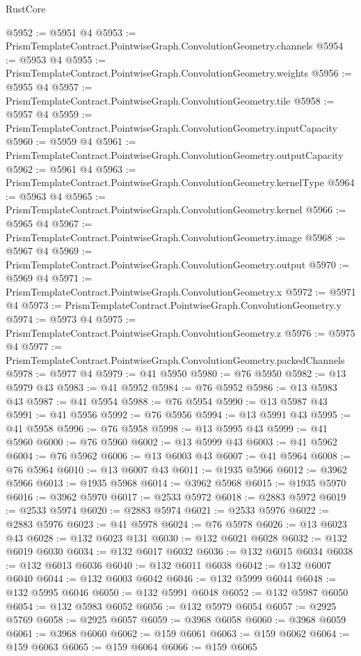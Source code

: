 \begin{lexlean}{RustCore}
\begin{coremodule}
@5952 := @5951 @4
@5953 := PrismTemplateContract.PointwiseGraph.ConvolutionGeometry.channels
@5954 := @5953 @4
@5955 := PrismTemplateContract.PointwiseGraph.ConvolutionGeometry.weights
@5956 := @5955 @4
@5957 := PrismTemplateContract.PointwiseGraph.ConvolutionGeometry.tile
@5958 := @5957 @4
@5959 := PrismTemplateContract.PointwiseGraph.ConvolutionGeometry.inputCapacity
@5960 := @5959 @4
@5961 := PrismTemplateContract.PointwiseGraph.ConvolutionGeometry.outputCapacity
@5962 := @5961 @4
@5963 := PrismTemplateContract.PointwiseGraph.ConvolutionGeometry.kernelType
@5964 := @5963 @4
@5965 := PrismTemplateContract.PointwiseGraph.ConvolutionGeometry.kernel
@5966 := @5965 @4
@5967 := PrismTemplateContract.PointwiseGraph.ConvolutionGeometry.image
@5968 := @5967 @4
@5969 := PrismTemplateContract.PointwiseGraph.ConvolutionGeometry.output
@5970 := @5969 @4
@5971 := PrismTemplateContract.PointwiseGraph.ConvolutionGeometry.x
@5972 := @5971 @4
@5973 := PrismTemplateContract.PointwiseGraph.ConvolutionGeometry.y
@5974 := @5973 @4
@5975 := PrismTemplateContract.PointwiseGraph.ConvolutionGeometry.z
@5976 := @5975 @4
@5977 := PrismTemplateContract.PointwiseGraph.ConvolutionGeometry.packedChannels
@5978 := @5977 @4
@5979 := @41 @5950
@5980 := @76 @5950
@5982 := @13 @5979 @43
@5983 := @41 @5952
@5984 := @76 @5952
@5986 := @13 @5983 @43
@5987 := @41 @5954
@5988 := @76 @5954
@5990 := @13 @5987 @43
@5991 := @41 @5956
@5992 := @76 @5956
@5994 := @13 @5991 @43
@5995 := @41 @5958
@5996 := @76 @5958
@5998 := @13 @5995 @43
@5999 := @41 @5960
@6000 := @76 @5960
@6002 := @13 @5999 @43
@6003 := @41 @5962
@6004 := @76 @5962
@6006 := @13 @6003 @43
@6007 := @41 @5964
@6008 := @76 @5964
@6010 := @13 @6007 @43
@6011 := @1935 @5966
@6012 := @3962 @5966
@6013 := @1935 @5968
@6014 := @3962 @5968
@6015 := @1935 @5970
@6016 := @3962 @5970
@6017 := @2533 @5972
@6018 := @2883 @5972
@6019 := @2533 @5974
@6020 := @2883 @5974
@6021 := @2533 @5976
@6022 := @2883 @5976
@6023 := @41 @5978
@6024 := @76 @5978
@6026 := @13 @6023 @43
@6028 := @132 @6023 @131
@6030 := @132 @6021 @6028
@6032 := @132 @6019 @6030
@6034 := @132 @6017 @6032
@6036 := @132 @6015 @6034
@6038 := @132 @6013 @6036
@6040 := @132 @6011 @6038
@6042 := @132 @6007 @6040
@6044 := @132 @6003 @6042
@6046 := @132 @5999 @6044
@6048 := @132 @5995 @6046
@6050 := @132 @5991 @6048
@6052 := @132 @5987 @6050
@6054 := @132 @5983 @6052
@6056 := @132 @5979 @6054
@6057 := @2925 @5769
@6058 := @2925 @6057
@6059 := @3968 @6058
@6060 := @3968 @6059
@6061 := @3968 @6060
@6062 := @159 @6061
@6063 := @159 @6062
@6064 := @159 @6063
@6065 := @159 @6064
@6066 := @159 @6065

\end{coremodule}
\end{lexlean}
